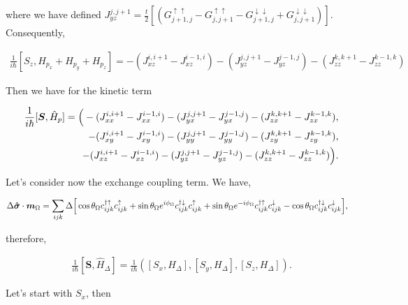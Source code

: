 \documentclass[10pt,prb,showpacs,amssymb,floatfix]{revtex4-1}
\newcommand{\dna}{\downarrow}
\newcommand{\nn}{\nonumber}
\newcommand{\upa}{\uparrow}
\newcommand{\Dlt}{\Delta}
\newcommand{\Og}{\Omega}
\newcommand{\sg}{\sigma}
\newcommand{\h}{\hat}
\begin{document}
where we have defined $J^{j,j+1}_{yz} = \frac{t}{2} [(  G_{j+1,j}^{\upa \upa} - G_{j,j+1}^{\upa\upa}  - G_{j+1,j}^{\dna\dna}   +  G_{j,j+1}^{\dna\dna} ) ]$. Consequently,

\begin{align}
\frac{1}{i\hbar}[S_z,H_{p_x} + H_{p_y}  + H_{p_z} ] = -(J^{i,i+1}_{xz} - J^{i-1,i}_{xz}) -(J^{j,j+1}_{yz} - J^{j-1,j}_{yz})  -(J^{k,k+1}_{zz} - J^{k-1,k}_{zz}) 
\end{align}

Then we have for the kinetic term

\begin{align}
\frac{1}{i\hbar}[\bm S, \h H_p] = \Big{(}-(J^{i,i+1}_{xx} - J^{i-1,i}_{xx}) -(J^{j,j+1}_{yx} - J^{j-1,j}_{yx})  -(J^{k,k+1}_{zx} - J^{k-1,k}_{zx}) , \nn\\ -(J^{i,i+1}_{xy} - J^{i-1,i}_{xy}) -(J^{j,j+1}_{yy} - J^{j-1,j}_{yy})  -(J^{k,k+1}_{zy} - J^{k-1,k}_{zy}) , \nn\\ -(J^{i,i+1}_{xz} - J^{i-1,i}_{xz}) -(J^{j,j+1}_{yz} - J^{j-1,j}_{yz})  -(J^{k,k+1}_{zz} - J^{k-1,k}_{zz}) \Big{)}.
\end{align}

Let's consider now the exchange coupling term. We have,

\begin{align}
\Dlt \bm{\h \sg}\cdot \bm m_\Og &= \sum_{ijk} \Dlt \Big{[} \cos\theta_\Og c_{ijk}^{\dagger \uparrow} c_{ijk}^\uparrow +  \sin\theta_\Og e^{i\phi_\Og} c_{ijk}^{\dagger \downarrow} c_{ijk}^\uparrow+  \sin\theta_\Og e^{-i\phi_\Og} c_{ijk}^{\dagger \uparrow} c_{ijk}^\downarrow - \cos\theta_\Og  c_{ijk}^{\dagger \downarrow} c_{ijk}^\downarrow  \Big{]},
\end{align}

therefore,

\begin{align}
\frac{1}{i\hbar}[\bm S, \h H_\Dlt] =  \frac{1}{i\hbar}([S_x, H_{\Dlt}], 
    [S_y, H_{\Dlt}],  
    [S_z, H_{\Dlt}] ).
\end{align}

Let's start with $S_x$, then
\end{document}
